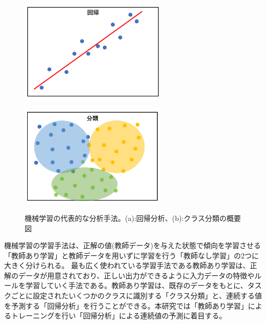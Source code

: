 \begin{figure}[tb]
  \centering
    \begin{minipage}[b]{0.4\linewidth}
        \centering
        \includegraphics[clip, width=7cm]{fig/4/regression.png}
        \vspace{10pt}
        \subcaption{}
        \label{fig:regre}
    \end{minipage}
    \hfill
    \begin{minipage}[b]{0.4\linewidth}
        \centering
        \includegraphics[clip, width=7cm]{fig/4/classification.png}
        \vspace{10pt}
        \subcaption{}
        \label{fig:class}
    \end{minipage}
  \caption{機械学習の代表的な分析手法。(a):回帰分析、(b):クラス分類の概要図}
  \label{fig:fit_def}
\end{figure}

機械学習の学習手法は、正解の値(教師データ)を与えた状態で傾向を学習させる「教師あり学習」と教師データを用いずに学習を行う「教師なし学習」の2つに大きく分けられる。
最も広く使われている学習手法である教師あり学習は、正解のデータが用意されており、正しい出力ができるように入力データの特徴やルールを学習していく手法である。教師あり学習は、既存のデータをもとに、タスクごとに設定されたいくつかのクラスに識別する「クラス分類」と、連続する値を予測する「回帰分析」を行うことができる。本研究では「教師あり学習」によるトレーニングを行い「回帰分析」による連続値の予測に着目する。

